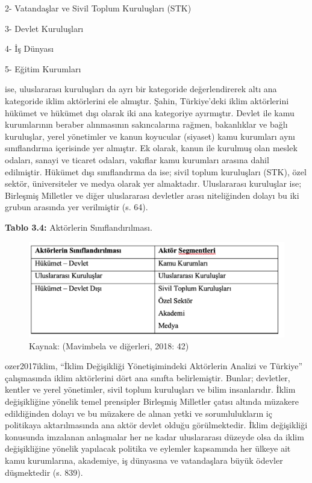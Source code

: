 \documentclass[
]{book}
\begin{document}
2- Vatandaşlar ve Sivil Toplum Kuruluşları (STK)

3- Devlet Kuruluşları

4- İş Dünyası

5- Eğitim Kurumları

\citet{sahin2014turkiye} ise, uluslararası kuruluşları da ayrı bir kategoride değerlendirerek altı ana kategoride iklim aktörlerini ele almıştır. Şahin, Türkiye'deki iklim aktörlerini hükümet ve hükümet dışı olarak iki ana kategoriye ayırmıştır. Devlet ile kamu kurumlarının beraber alınmasının sakıncalarına rağmen, bakanlıklar ve bağlı kuruluşlar, yerel yönetimler ve kanun koyucular (siyaset) kamu kurumları aynı sınıflandırma içerisinde yer almıştır. Ek olarak, kanun ile kurulmuş olan meslek odaları, sanayi ve ticaret odaları, vakıflar kamu kurumları arasına dahil edilmiştir. Hükümet dışı sınıflandırma da ise; sivil toplum kuruluşları (STK), özel sektör, üniversiteler ve medya olarak yer almaktadır. Uluslararası kuruluşlar ise; Birleşmiş Milletler ve diğer uluslararası devletler arası niteliğinden dolayı bu iki grubun arasında yer verilmiştir (s. 64). \citep{sahin2014turkiye}

\textbf{Tablo 3.4:} Aktörlerin Sınıflandırılması.

\begin{figure}
\includegraphics[width=0.95\linewidth,height=0.95\textheight]{tablolar-sekiller/tablo-3-4} \caption{Kaynak: (Mavimbela ve diğerleri, 2018: 42)}\label{fig:unnamed-chunk-7}
\end{figure}

ozer2017iklim, ``İklim Değişikliği Yönetişimindeki Aktörlerin Analizi ve Türkiye'' çalışmasında iklim aktörlerini dört ana sınıfta belirlemiştir. Bunlar; devletler, kentler ve yerel yönetimler, sivil toplum kuruluşları ve bilim insanlarıdır. İklim değişikliğine yönelik temel prensipler Birleşmiş Milletler çatısı altında müzakere edildiğinden dolayı ve bu müzakere de alınan yetki ve sorumlulukların iç politikaya aktarılmasında ana aktör devlet olduğu görülmektedir. İklim değişikliği konusunda imzalanan anlaşmalar her ne kadar uluslararası düzeyde olsa da iklim değişikliğine yönelik yapılacak politika ve eylemler kapsamında her ülkeye ait kamu kurumlarına, akademiye, iş dünyasına ve vatandaşlara büyük ödevler düşmektedir (s. 839). \citep{ozer2017iklim}
\end{document}
